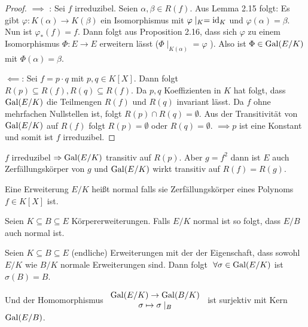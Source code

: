 \begin{proof}
	$\implies$ : Sei $f$ irreduzibel. Seien $\alpha,\beta \in R(f)$.
	Aus Lemma 2.15 folgt: Es gibt $\varphi: K(\alpha) \to K(\beta)$ ein Isomorphismus mit $\varphi \mid_{K} = \operatorname{id}_{K}$ und $\varphi(\alpha) = \beta$.
	Nun ist $\varphi_{*}(f) = f$. Dann folgt aus Proposition 2.16, dass sich $\varphi$ zu einem Isomorphismus $\Phi: E \to E$ erweitern lässt ($\Phi \mid_{K(\alpha)} = \varphi$ ).
	Also ist $\Phi \in \operatorname{Gal}(E/K)$ mit $\Phi(\alpha) = \beta$.

	$\impliedby$: Sei $f = p\cdot q$ mit $p,q \in K[X]$. Dann folgt $R(p) \subseteq R(f), R(q) \subseteq R(f)$.
	Da $p,q$ Koeffizienten in $K$ hat folgt, dass $\operatorname{Gal}(E /K)$ die Teilmengen $R(f)$ und $R(q)$ invariant lässt.
	Da $f$ ohne mehrfachen Nullstellen ist, folgt $R(p) \cap R(q) = \emptyset$.
	Aus der Transitivität von $\operatorname{Gal}(E / K)$ auf $R(f)$ folgt $R(p) = \emptyset$ oder $R(q) = \emptyset$.
	$\implies p$ ist eine Konstant und somit ist $f$ irreduzibel.
\end{proof}

\begin{eg}
	$f$ irreduzibel $\Rightarrow \operatorname{Gal}(E / K)$ transitiv auf $R(p)$. Aber  $g = f^2$ dann ist $E$ auch Zerfällungskörper von $g$ und $\operatorname{Gal}(E / K)$ wirkt transitiv auf $R(f) = R(g)$.
\end{eg}

\begin{definition}
	Eine Erweiterung $E / K$ heißt normal falls sie Zerfällungskörper eines Polynoms $f \in K[X]$ ist.
\end{definition}

\begin{claim}
	Seien $K \subseteq B \subseteq E$ Körpererweiterungen. Falls $E / K$ normal ist so folgt, dass $E / B$ auch  normal ist.
\end{claim}

\begin{theorem}
	Seien $K \subseteq B \subseteq E$ (endliche) Erweiterungen mit der der Eigenschaft, dass sowohl $E / K$ wie $B / K$ normale Erweiterungen sind.
	Dann folgt $\forall \sigma \in \gal(E / K)$ ist $\sigma(B) = B$.

	Und der Homomorphismus $\begin{array}{c} \operatorname{Gal}(E / K) \to \operatorname{Gal}(B / K)\\ \sigma \mapsto \sigma \mid_{B}\\ \end{array}$ ist surjektiv mit Kern $\operatorname{Gal}(E / B)$.
\end{theorem}

